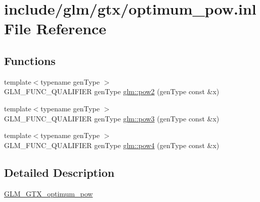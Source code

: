 \hypertarget{optimum__pow_8inl}{}\section{include/glm/gtx/optimum\+\_\+pow.inl File Reference}
\label{optimum__pow_8inl}
\subsection*{Functions}
\begin{DoxyCompactItemize}
\item 
{\footnotesize template$<$typename gen\+Type $>$ }\\G\+L\+M\+\_\+\+F\+U\+N\+C\+\_\+\+Q\+U\+A\+L\+I\+F\+I\+ER gen\+Type \hyperlink{group__gtx__optimum__pow_ga19aaff3213bf23bdec3ef124ace237e9}{glm\+::pow2} (gen\+Type const \&x)
\item 
{\footnotesize template$<$typename gen\+Type $>$ }\\G\+L\+M\+\_\+\+F\+U\+N\+C\+\_\+\+Q\+U\+A\+L\+I\+F\+I\+ER gen\+Type \hyperlink{group__gtx__optimum__pow_ga35689d03cd434d6ea819f1942d3bf82e}{glm\+::pow3} (gen\+Type const \&x)
\item 
{\footnotesize template$<$typename gen\+Type $>$ }\\G\+L\+M\+\_\+\+F\+U\+N\+C\+\_\+\+Q\+U\+A\+L\+I\+F\+I\+ER gen\+Type \hyperlink{group__gtx__optimum__pow_gacef0968763026e180e53e735007dbf5a}{glm\+::pow4} (gen\+Type const \&x)
\end{DoxyCompactItemize}


\subsection{Detailed Description}
\hyperlink{group__gtx__optimum__pow}{G\+L\+M\+\_\+\+G\+T\+X\+\_\+optimum\+\_\+pow} 